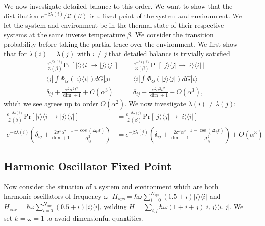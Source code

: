 \documentclass{article}
\newcommand{\ket}[1]{|#1\rangle}
\newcommand{\bra}[1]{\langle #1|}
\newcommand{\ketbra}[2]{| #1\rangle\! \langle #2|}
\newcommand{\parens}[1]{\left( #1 \right)}
\newcommand{\prob}[1]{\text{Pr}\left[ #1 \right]}
\newcommand{\bigo}[1]{O\left( #1 \right)}
\newcommand{\partfun}{\mathcal{Z}}
\begin{document}
\newpage
\noindent\makebox[\linewidth]{\rule{\textwidth}{0.4pt}}
\noindent\makebox[\linewidth]{\rule{\textwidth}{0.4pt}}
We now investigate detailed balance to this order. We want to show that the distribution $e^{- \beta \lambda(i)} / \partfun (\beta)$ is a fixed point of the system and environment. We let the system and environment be in the thermal state of their respective systems at the same inverse temperature $\beta$. We consider the transition probability before taking the partial trace over the environment. 
We first show that for $\lambda(i) = \lambda(j)$ with $i \neq j$ that detailed balance is trivially satisfied
\begin{align}
    \frac{e^{-\beta \lambda(i)}}{\partfun(\beta)} \prob{\ketbra{i}{i} \to \ketbra{j}{j}} &= \frac{e^{-\beta \lambda(j)}}{\partfun(\beta)} \prob{\ketbra{j}{j} \to \ketbra{i}{i}} \\
    \bra{j} \int \Phi_G(\ketbra{i}{i}) dG \ket{j} &= \bra{i} \int \Phi_G(\ketbra{j}{j}) dG \ket{i} \\
    \delta_{ij} + \frac{\alpha^2 \sigma^2 t^2}{\dim + 1} + \bigo{\alpha^3} &= \delta_{ij} + \frac{\alpha^2 \sigma^2 t^2}{\dim + 1} + \bigo{\alpha^3},
\end{align}
which we see agrees up to order $\bigo{\alpha^2}$. We now investigate $\lambda(i) \neq \lambda(j)$:
\begin{align}
    \frac{e^{-\beta \lambda(i)}}{\partfun(\beta)} \prob{\ketbra{i}{i} \to \ketbra{j}{j}} &= \frac{e^{-\beta \lambda(j)}}{\partfun(\beta)} \prob{\ketbra{j}{j} \to \ketbra{i}{i}} \\
    e^{-\beta \lambda(i)} \parens{\delta_{ij} + \frac{2 \sigma^2 \alpha^2}{\dim + 1} \frac{1 - \cos(\Delta_{ij} t)}{\Delta_{ij}^2}} &= e^{-\beta \lambda(j)} \parens{\delta_{ij} + \frac{2 \sigma^2 \alpha^2}{\dim + 1} \frac{1 - \cos(\Delta_{ij} t)}{\Delta_{ij}^2}} + \bigo{\alpha^3}
\end{align}
\newpage


\subsection{Harmonic Oscillator Fixed Point}
Now consider the situation of a system and environment which are both harmonic oscillators of frequency $\omega$, $H_{sys} = \hbar \omega \sum_{i=0}^{N_{sys}} (0.5 + i) \ketbra{i}{i}$ and $H_{env} = \hbar \omega \sum_{i=0}^{N_{env}} (0.5 + i) \ketbra{i}{i}$, yeilding $H = \sum_{i,j} \hbar \omega (1 + i + j) \ketbra{i,j}{i,j}$. We set $\hbar = \omega = 1$ to avoid dimensionful quantities. 
\end{document}
